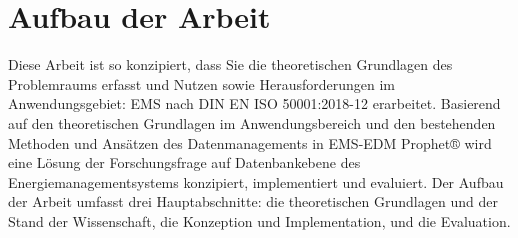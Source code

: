 \section{Aufbau der Arbeit}
Diese Arbeit ist so konzipiert, dass Sie die theoretischen Grundlagen des Problemraums erfasst und Nutzen sowie Herausforderungen im Anwendungsgebiet: 
EMS nach DIN EN ISO 50001:2018-12 erarbeitet. 
Basierend auf den theoretischen Grundlagen im Anwendungsbereich und den bestehenden Methoden und Ansätzen des Datenmanagements 
in EMS-EDM Prophet® wird eine Lösung der Forschungsfrage auf Datenbankebene des Energiemanagementsystems konzipiert, 
implementiert und evaluiert.
Der Aufbau der Arbeit umfasst drei Hauptabschnitte: die theoretischen Grundlagen und der Stand der Wissenschaft, die Konzeption und Implementation, und die 
Evaluation.

